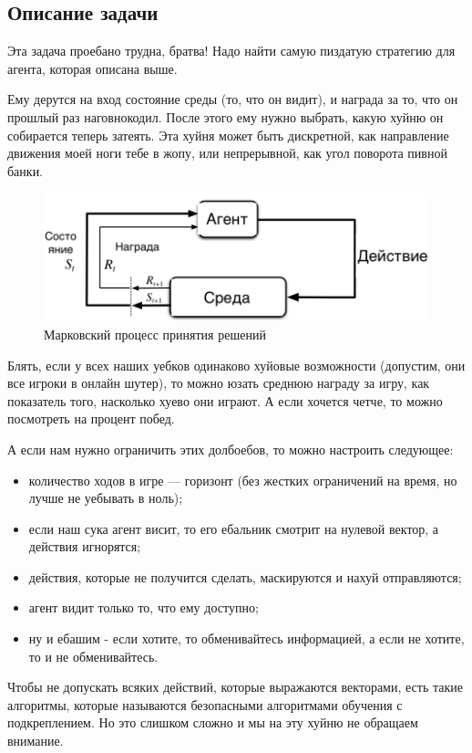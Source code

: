 \subsection{Описание задачи}

Эта задача проебано трудна, братва! Надо найти самую пиздатую стратегию для агента, которая описана выше.

Ему дерутся на вход состояние среды (то, что он видит), и награда за то, что он прошлый раз наговнокодил.
После этого ему нужно выбрать, какую хуйню он собирается теперь затеять.
Эта хуйня может быть дискретной, как направление движения моей ноги тебе в жопу, или непрерывной, как угол поворота пивной банки.
\begin{figure}[H]
	\label{fig:mdp}
	\includegraphics[width=\textwidth]{./inc/img/mdp.png}
	\caption{Марковский процесс принятия решений}
\end{figure}

Блять, если у всех наших уебков одинаково хуйовые возможности (допустим, они все игроки в онлайн шутер), то можно юзать среднюю награду за игру, как показатель того, насколько хуево они играют. А если хочется четче, то можно посмотреть на процент побед.

\pagebreak

А если нам нужно ограничить этих долбоебов, то можно настроить следующее:

\begin{itemize}[label=---]
\item количество ходов в игре --- горизонт (без жестких ограничений на время, но лучше не уебывать в ноль);
\item если наш сука агент висит, то его ебальник смотрит на нулевой вектор, а действия игнорятся;
\item действия, которые не получится сделать, маскируются и нахуй отправляются;
\item агент видит только то, что ему доступно;
\item ну и ебашим - если хотите, то обменивайтесь информацией, а если не хотите, то и не обменивайтесь.
\end{itemize}
Чтобы не допускать всяких действий, которые выражаются векторами, есть такие алгоритмы, которые называются безопасными алгоритмами обучения с подкреплением. Но это слишком сложно и мы на эту хуйню не обращаем внимание.

